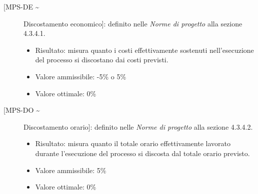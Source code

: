 \documentclass[../piano-di-qualifica.tex]{subfiles}
\begin{document}
\begin{description}
  \item [[MPS-DE \textasciitilde] Discostamento economico]: definito nelle \textit{Norme di progetto} alla sezione 4.3.4.1.
        \begin{itemize} \item Risultato: misura quanto i costi effettivamente sostenuti nell’esecuzione del
                processo si discostano dai costi previsti. \item Valore ammissibile: -5\% o 5\% \item Valore ottimale: 0\% \end{itemize}

  \item [[MPS-DO \textasciitilde] Discostamento orario]: definito nelle \textit{Norme di progetto} alla sezione 4.3.4.2.
        \begin{itemize} \item Risultato: misura quanto il totale orario effettivamente lavorato durante l’esecuzione
                del processo si discosta dal totale orario previsto. \item Valore ammissibile: 5\% \item Valore ottimale: 0\% \end{itemize}
\end{description}






\end{document}
